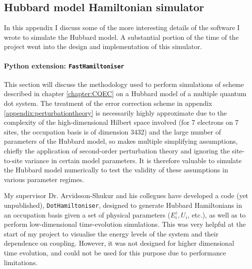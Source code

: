 \documentclass{report}
\begin{document}
\begin{appendices}
\chapter{Hubbard model Hamiltonian simulator}\label{appendix:code}

In this appendix I discuss some of the more interesting details of the software I wrote to simulate the Hubbard model. A substantial portion of the time of the project went into the design and implementation of this simulator.

\subsubsection{Python extension: \texttt{FastHamiltoniser}}
This section will discuss the methodology used to perform simulations of scheme described in chapter \ref{chapter:CQEC} on a Hubbard model of a multiple quantum dot system. The treatment of the error correction scheme in appendix \ref{appendix:perturbationtheory} is necessarily highly approximate due to the complexity of the high-dimensional Hilbert space involved (for 7 electrons on 7 sites, the occupation basis is of dimension 3432) and the large number of parameters of the Hubbard model, so makes multiple simplifying assumptions, chiefly the application of second-order perturbation theory and ignoring the site-to-site variance in certain model parameters. It is therefore valuable to simulate the Hubbard model numerically to test the validity of these assumptions in various parameter regimes.

My supervisor Dr. Arvidsson-Shukur and his collegues have developed a code (yet unpublished), \texttt{DotHamiltoniser}, designed to generate Hubbard Hamiltonians in an occupation basis given a set of physical parameters ($E_i^z, U_i$, etc.), as well as to perform low-dimensional time-evolution simulations. This was very helpful at the start of my project to visualise the energy levels of the system and their dependence on coupling. However, it was not designed for higher dimensional time evolution, and could not be used for this purpose due to performance limitations.


\end{appendices}
\end{document}
